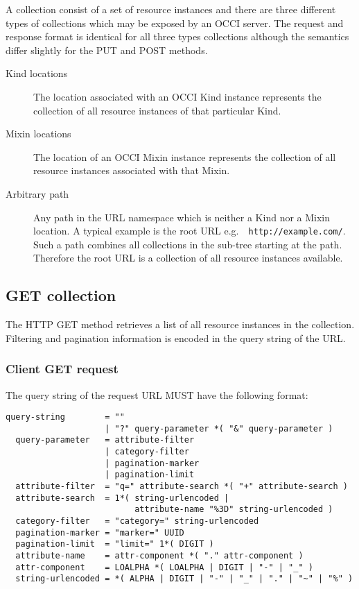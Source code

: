 \documentclass[10pt,a4paper]{article}
\begin{document}
A collection consist of a set of resource instances and there are three
different types of collections which may be exposed by an OCCI server.  The
request and response format is identical for all three types collections
although the semantics differ slightly for the PUT and POST methods.
\begin{description}
\item[Kind locations] The location associated with an OCCI Kind instance
represents the collection of all resource instances of that particular Kind.
\item[Mixin locations] The location of an OCCI Mixin instance represents the
collection of all resource instances associated with that Mixin.
\item[Arbitrary path] Any path in the URL namespace which is neither a Kind nor
a Mixin location. A typical example is the root URL e.g.~{\tt
http://example.com/}. Such a path combines all collections in the sub-tree
starting at the path. Therefore the root URL is a collection of all resource
instances available.
\end{description}

\subsection{GET collection}
The HTTP GET method retrieves a list of all resource instances in the
collection. Filtering and pagination information is encoded in the query string
of the URL.

\subsubsection{Client GET request}
The query string of the request URL MUST have the following format:
\begin{verbatim}
query-string        = ""
                    | "?" query-parameter *( "&" query-parameter )
  query-parameter   = attribute-filter
                    | category-filter
                    | pagination-marker
                    | pagination-limit
  attribute-filter  = "q=" attribute-search *( "+" attribute-search )
  attribute-search  = 1*( string-urlencoded |
                          attribute-name "%3D" string-urlencoded )
  category-filter   = "category=" string-urlencoded
  pagination-marker = "marker=" UUID
  pagination-limit  = "limit=" 1*( DIGIT )
  attribute-name    = attr-component *( "." attr-component )
  attr-component    = LOALPHA *( LOALPHA | DIGIT | "-" | "_" )
  string-urlencoded = *( ALPHA | DIGIT | "-" | "_" | "." | "~" | "%" )

\end{verbatim}
\end{document}
